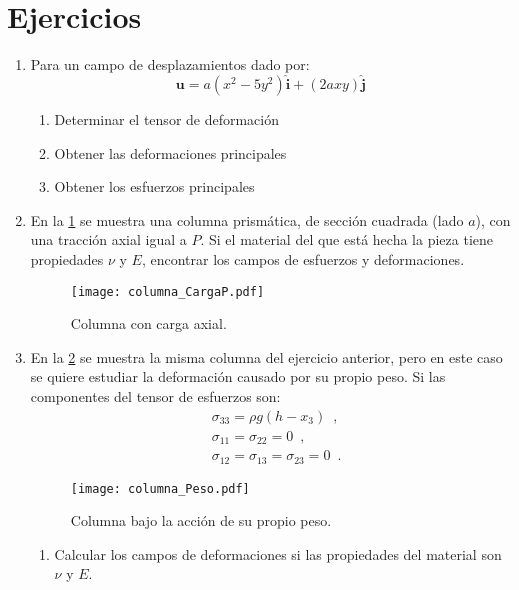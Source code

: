 \documentclass[../notas medios.tex]{subfiles}
\begin{document}
\section{Ejercicios}

\begin{enumerate}

\item \label{punto01_m} Para un campo de desplazamientos dado por:
\[\mathbf{u} = a(x^2 - 5y^2)\hat{\mathbf{i}} + (2ax y)\hat{\mathbf{j}} \]

\begin{enumerate}
\item Determinar el tensor de deformación
\item Obtener las deformaciones principales
\item Obtener los esfuerzos principales
\end{enumerate}

\item \label{punto02_m}  En la  \cref{columna_CargaP} se muestra una columna prismática, de sección cuadrada (lado $a$), con una tracción axial igual a $P$. Si el material del que está hecha la pieza tiene propiedades $\nu$ y $E$, encontrar los campos de esfuerzos y deformaciones.
\begin{figure}[H]
	\centering
	\texttt{[image: columna\_CargaP.pdf]}
	\caption{Columna con carga axial.}
	\label{columna_CargaP}
\end{figure}

\item \label{punto03_m} En la \cref{fig:columna_g} se muestra la misma columna  del ejercicio anterior, pero en este caso se quiere estudiar la deformación causado por su propio peso. Si las componentes del tensor de esfuerzos son:
\begin{align*}
&\sigma_{33} = \rho g(h- x_{3}) \enspace ,\\
&\sigma_{11} = \sigma_{22} = 0 \enspace ,\\
&\sigma_{12} = \sigma_{13} = \sigma_{23} = 0 \enspace .
\end{align*}

\begin{figure}[h]
	\centering
	\texttt{[image: columna\_Peso.pdf]}
	\caption{Columna bajo la acción de su propio peso.}
	\label{fig:columna_g}
\end{figure}

\begin{enumerate}
\item Calcular los campos de deformaciones si las propiedades del material son $\nu$ y $E$.
\end{enumerate}



\end{enumerate}
\end{document}
